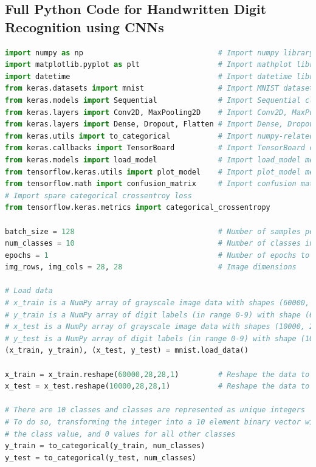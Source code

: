 \documentclass{book}
\begin{document}
\subsection{Full Python Code for Handwritten Digit Recognition using CNNs}
\begin{lstlisting}[language=Python, basicstyle=\ttfamily\small, keywordstyle=\color{blue}, commentstyle=\color{forestgreen}, stringstyle=\color{red}, showstringspaces=false]
import numpy as np                               # Import numpy library
import matplotlib.pyplot as plt                  # Import mathplot library
import datetime                                  # Import datetime library
from keras.datasets import mnist                 # Import MNIST dataset
from keras.models import Sequential              # Import Sequential class
from keras.layers import Conv2D, MaxPooling2D    # Import Conv2D, MaxPooling2D class
from keras.layers import Dense, Dropout, Flatten # Import Dense, Dropout, Flatten class
from keras.utils import to_categorical           # Import numpy-related utilities
from keras.callbacks import TensorBoard          # Import TensorBoard class
from keras.models import load_model              # Import load_model method
from tensorflow.keras.utils import plot_model    # Import plot_model method
from tensorflow.math import confusion_matrix     # Import confusion matrix method
# Import spare categorical crossentroy loss
from tensorflow.keras.metrics import categorical_crossentropy

batch_size = 128                                 # Number of samples per gradient update
num_classes = 10                                 # Number of classes in the dataset
epochs = 1                                       # Number of epochs to train the model
img_rows, img_cols = 28, 28                      # Image dimensions

# Load data
# x_train is a NumPy array of grayscale image data with shapes (60000, 28, 28)
# y_train is a NumPy array of digit labels (in range 0-9) with shape (60000,)
# x_test is a NumPy array of grayscale image data with shapes (10000, 28, 28)
# y_test is a NumPy array of digit labels (in range 0-9) with shape (10000,)
(x_train, y_train), (x_test, y_test) = mnist.load_data()

x_train = x_train.reshape(60000,28,28,1)         # Reshape the data to 4-dimension
x_test = x_test.reshape(10000,28,28,1)           # Reshape the data to 4-dimension

# There are 10 classes and classes are represented as unique integers
# To do so, transforming the integer into a 10 element binary vector with a 1 for the index of 
# the class value, and 0 values for all other classes
y_train = to_categorical(y_train, num_classes)
y_test = to_categorical(y_test, num_classes)


\end{lstlisting}
\end{document}
